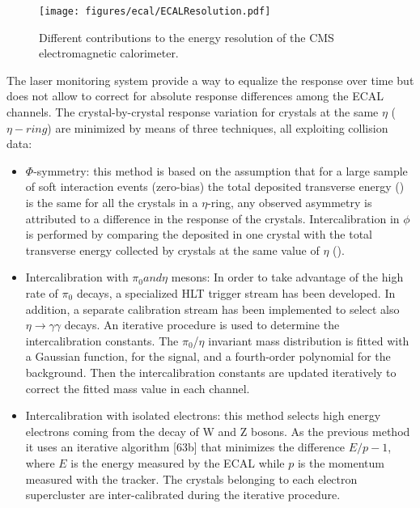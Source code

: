 \begin{figure}[!htb]
\begin{center}
  \texttt{[image: figures/ecal/ECALResolution.pdf]}
  \caption{Different contributions to the energy resolution of the CMS \PbWO electromagnetic
           calorimeter.}
  \label{fig:ECALResolution}
\end{center}
\end{figure}

The laser monitoring system provide a way to equalize the response over time but does not allow to
correct for absolute response differences among the ECAL channels. The crystal-by-crystal response variation
for crystals at the same $\eta$ ($\eta-ring$) are minimized by means of three techniques, all exploiting collision data:

\begin{itemize}
\item $\Phi$-symmetry: this method is based on the assumption that for a large sample of soft interaction
events (zero-bias) the total deposited transverse energy (\sumEt) is the same for all the crystals in a
$\eta$-ring, any observed asymmetry is attributed to a difference in the response of the crystals.
Intercalibration in $\phi$ is performed by comparing the \sumEt deposited in one crystal
with the total transverse energy collected by crystals at the same value of $\eta$ (\sumEtring).

\item Intercalibration with $\pi_0 and \eta$ mesons:
  In order to take advantage of the high rate of $\pi_0$ decays, a specialized HLT trigger stream has
been developed. In addition, a separate calibration stream has been implemented to select also
$\eta\to\gamma\gamma$ decays. An iterative procedure is used to determine the intercalibration constants.
The $\pi_0$/$\eta$ invariant mass distribution is fitted with a Gaussian function, for the signal, and a
fourth-order polynomial for the background. Then the intercalibration constants are updated
iteratively to correct the fitted mass value in each channel.

\item Intercalibration with isolated electrons: this method selects high energy electrons coming from the decay of
  W and Z bosons. As the previous method it uses an iterative algorithm [63b] that minimizes the difference $E/p - 1$,
  where $E$ is the energy measured by the ECAL while $p$ is the momentum measured with the tracker.
  The crystals belonging to each electron supercluster are inter-calibrated during the iterative procedure.
\end{itemize}

